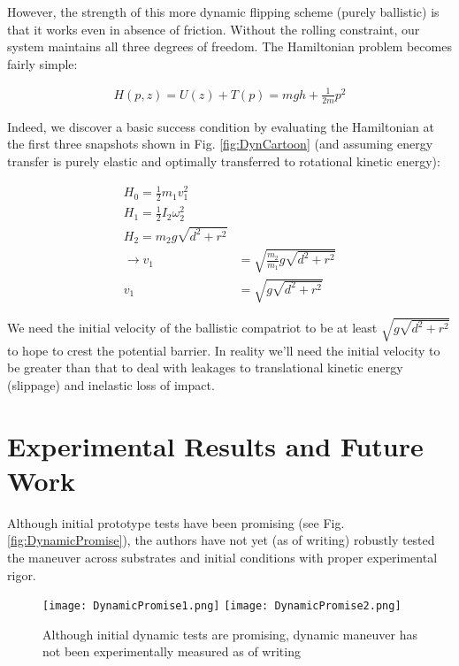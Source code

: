 \documentclass[letterpaper]{report}
\begin{document}

However, the strength of this more dynamic flipping scheme (purely ballistic) is that it works even in absence of friction.
Without the rolling constraint, our system maintains all three degrees of freedom.
The Hamiltonian problem becomes fairly simple:

\begin{align}
  H(p,z) = U(z) + T(p) = m g h + \frac{1}{2 m} p^2
\end{align}

Indeed, we discover a basic success condition by evaluating the Hamiltonian at the first three snapshots shown in Fig. \ref{fig:DynCartoon} (and assuming energy transfer is purely elastic and optimally transferred to rotational kinetic energy):

\begin{align}
H_0 = \frac{1}{2} m_1 v_1^2  \\
H_1 = \frac{1}{2} I_2 \omega_2^2  \\
H_2 = m_2 g \sqrt{d^2+r^2} \\
\rightarrow v_1 &= \sqrt{\frac{m_2}{m_1}g \sqrt{d^2+r^2}} \\
 v_1 &= \sqrt{g \sqrt{d^2+r^2}}
\end{align}

We need the initial velocity of the ballistic compatriot to be at least $\sqrt{g \sqrt{d^2+r^2}}$ to hope to crest the potential barrier.
In reality we'll need the initial velocity to be greater than that to deal with leakages to translational kinetic energy (slippage) and inelastic loss of impact.

\section{Experimental Results and Future Work}
Although initial prototype tests have been promising (see Fig. \ref{fig:DynamicPromise}), the authors have not yet (as of writing) robustly tested the maneuver across substrates and initial conditions with proper experimental rigor.

\begin{figure}[ht]
  \centering
  \texttt{[image: DynamicPromise1.png]}
  \texttt{[image: DynamicPromise2.png]}
  \caption{\label{fig:DynamicFlipRealLife}Although initial dynamic tests are promising, dynamic maneuver has not been experimentally measured as of writing}
\end{figure}
\end{document}
